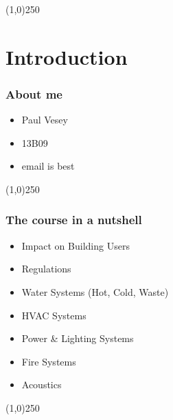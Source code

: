 %


\lstset{language=HTML,
				basicstyle=\small,
				breaklines=true,
        numbers=left,
        numberstyle=\tiny,
        showstringspaces=false,
        aboveskip=-20pt,
        frame=leftline
        }



\tableofcontents
\newpage



\begin{frame}
\titlepage
\end{frame}\begin{center}\line(1,0){250}\end{center}
%
%


\section{Introduction}




\begin{frame}
\frametitle{About me}
\begin{itemize}
	\item Paul Vesey
	\item 13B09
	\item email is best
\end{itemize}

\end{frame}
\begin{center}\line(1,0){250}\end{center}







\begin{frame}
\frametitle{The course in a nutshell}
\begin{itemize}
	\item Impact on Building Users
	\item Regulations
	\item Water Systems (Hot, Cold, Waste)
	\item HVAC Systems
	\item Power \& Lighting Systems
	\item Fire Systems
	\item Acoustics
\end{itemize}
\end{frame}\begin{center}\line(1,0){250}\end{center}


